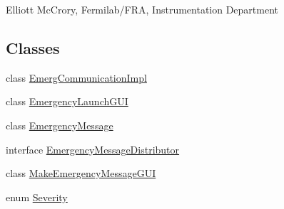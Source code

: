 Elliott Mc\-Crory, Fermilab/\-F\-R\-A, Instrumentation Department \subsection*{Classes}
\begin{DoxyCompactItemize}
\item 
class \hyperlink{classgov_1_1fnal_1_1ppd_1_1dd_1_1emergency_1_1EmergCommunicationImpl}{Emerg\-Communication\-Impl}
\item 
class \hyperlink{classgov_1_1fnal_1_1ppd_1_1dd_1_1emergency_1_1EmergencyLaunchGUI}{Emergency\-Launch\-G\-U\-I}
\item 
class \hyperlink{classgov_1_1fnal_1_1ppd_1_1dd_1_1emergency_1_1EmergencyMessage}{Emergency\-Message}
\item 
interface \hyperlink{interfacegov_1_1fnal_1_1ppd_1_1dd_1_1emergency_1_1EmergencyMessageDistributor}{Emergency\-Message\-Distributor}
\item 
class \hyperlink{classgov_1_1fnal_1_1ppd_1_1dd_1_1emergency_1_1MakeEmergencyMessageGUI}{Make\-Emergency\-Message\-G\-U\-I}
\item 
enum \hyperlink{enumgov_1_1fnal_1_1ppd_1_1dd_1_1emergency_1_1Severity}{Severity}
\end{DoxyCompactItemize}
